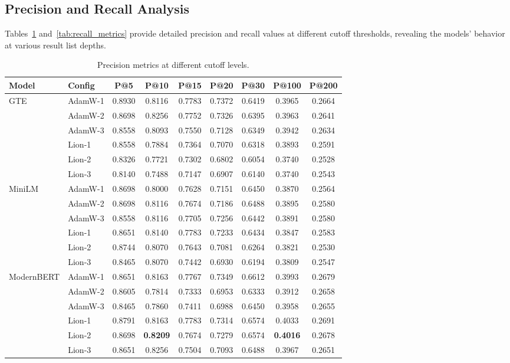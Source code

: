 \documentclass[conference]{IEEEtran}
\begin{document}
\subsection{Precision and Recall Analysis}
Tables~\ref{tab:precision_metrics} and~\ref{tab:recall_metrics} provide detailed precision and recall values at different cutoff thresholds, revealing the models' behavior at various result list depths.

\begin{table}[t]
\centering
\caption{Precision metrics at different cutoff levels.}
\label{tab:precision_metrics}
\small
\begin{tabular}{llccccccc}
\toprule
\textbf{Model} & \textbf{Config} & \textbf{P@5} & \textbf{P@10} & \textbf{P@15} & \textbf{P@20} & \textbf{P@30} & \textbf{P@100} & \textbf{P@200} \\
\midrule
\multirow{6}{*}{GTE} & AdamW-1 & 0.8930 & 0.8116 & 0.7783 & 0.7372 & 0.6419 & 0.3965 & 0.2664 \\
 & AdamW-2 & 0.8698 & 0.8256 & 0.7752 & 0.7326 & 0.6395 & 0.3963 & 0.2641 \\
 & AdamW-3 & 0.8558 & 0.8093 & 0.7550 & 0.7128 & 0.6349 & 0.3942 & 0.2634 \\
 & Lion-1 & 0.8558 & 0.7884 & 0.7364 & 0.7070 & 0.6318 & 0.3893 & 0.2591 \\
 & Lion-2 & 0.8326 & 0.7721 & 0.7302 & 0.6802 & 0.6054 & 0.3740 & 0.2528 \\
 & Lion-3 & 0.8140 & 0.7488 & 0.7147 & 0.6907 & 0.6140 & 0.3740 & 0.2543 \\
\midrule
\multirow{6}{*}{MiniLM} & AdamW-1 & 0.8698 & 0.8000 & 0.7628 & 0.7151 & 0.6450 & 0.3870 & 0.2564 \\
 & AdamW-2 & 0.8698 & 0.8116 & 0.7674 & 0.7186 & 0.6488 & 0.3895 & 0.2580 \\
 & AdamW-3 & 0.8558 & 0.8116 & 0.7705 & 0.7256 & 0.6442 & 0.3891 & 0.2580 \\
 & Lion-1 & 0.8651 & 0.8140 & 0.7783 & 0.7233 & 0.6434 & 0.3847 & 0.2583 \\
 & Lion-2 & 0.8744 & 0.8070 & 0.7643 & 0.7081 & 0.6264 & 0.3821 & 0.2530 \\
 & Lion-3 & 0.8465 & 0.8070 & 0.7442 & 0.6930 & 0.6194 & 0.3809 & 0.2547 \\
\midrule
\multirow{6}{*}{ModernBERT} & AdamW-1 & 0.8651 & 0.8163 & 0.7767 & 0.7349 & 0.6612 & 0.3993 & 0.2679 \\
 & AdamW-2 & 0.8605 & 0.7814 & 0.7333 & 0.6953 & 0.6333 & 0.3912 & 0.2658 \\
 & AdamW-3 & 0.8465 & 0.7860 & 0.7411 & 0.6988 & 0.6450 & 0.3958 & 0.2655 \\
 & Lion-1 & 0.8791 & 0.8163 & 0.7783 & 0.7314 & 0.6574 & 0.4033 & 0.2691 \\
 & Lion-2 & 0.8698 & \textbf{0.8209} & 0.7674 & 0.7279 & 0.6574 & \textbf{0.4016} & 0.2678 \\
 & Lion-3 & 0.8651 & 0.8256 & 0.7504 & 0.7093 & 0.6488 & 0.3967 & 0.2651 \\
\bottomrule
\end{tabular}
\end{table}
\end{document}
